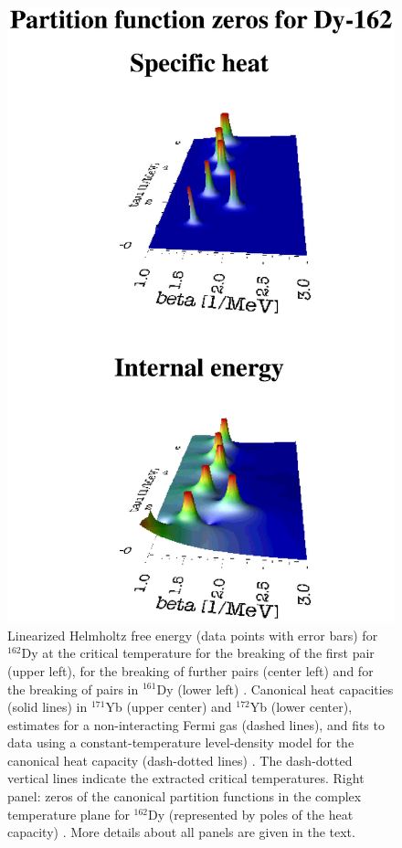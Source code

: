 \documentclass[sort&compress,final,numberedheadings]{aipproc}
\begin{document}
\begin{figure}
\includegraphics[totalheight=5cm,angle=0,bb=219 422 414 625,clip]{fig5c.ps}
\caption{Linearized Helmholtz free energy (data points with error bars) for 
$^{162}$Dy at the critical temperature for the breaking of the first pair 
(upper left), for the breaking of further pairs (center left) and for the 
breaking of pairs in $^{161}$Dy (lower left) \protect\cite{GC03}. Canonical 
heat capacities (solid lines) in $^{171}$Yb (upper center) and $^{172}$Yb 
(lower center), estimates for a non-interacting Fermi gas (dashed lines), and 
fits to data using a constant-temperature level-density model for the canonical
heat capacity (dash-dotted lines) \protect\cite{SB01}. The dash-dotted vertical
lines indicate the extracted critical temperatures. Right panel: zeros of the 
canonical partition functions in the complex temperature plane for $^{162}$Dy 
(represented by poles of the heat capacity) \protect\cite{Bo01}. More details 
about all panels are given in the text.} 
\label{fig:phasetrans}
\end{figure}
\end{document}
